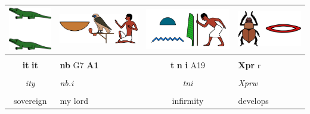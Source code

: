 \begin{center}
\vspace{7.5mm}

\begin{tabularx}{\linewidth}{cYcY}
	\includegraphics[scale=0.5]{word-images/1-2-1-ity} &
	\includegraphics[scale=0.5]{word-images/1-2-2-nbi} &
	\includegraphics[scale=0.5]{word-images/1-2-3-tni} &
	\includegraphics[scale=0.5]{word-images/1-2-4-xprw} \\
	\hline \\ 
	\textbf{it} \textbf{it} &
	\textbf{nb} G7 \textbf{A1} &
	\textbf{t} \textbf{n} \textbf{i} A19 &
	\textbf{Xpr} r \\
	\hline \\
	\textit{ity} & \textit{nb.i} & \textit{tni} & \textit{Xprw} \\  
	\hline \\
	sovereign & my lord & infirmity & develops
\end{tabularx}

\vspace{7.5mm}


\end{center}
